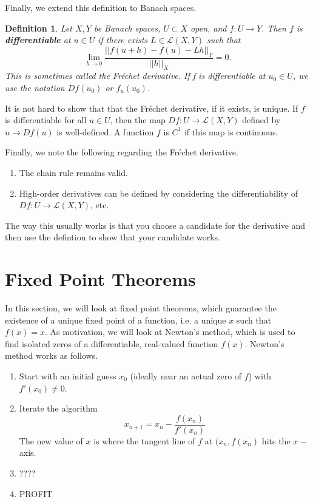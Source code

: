 \documentclass[10pt]{article}         %
\newtheorem{definition}{Definition}[section]
\theoremstyle{remark}
\begin{document}
Finally, we extend this definition to Banach spaces.

\begin{definition}
Let $X, Y$ be Banach spaces, $U \subset X$ open, and $f \colon U \rightarrow Y$. Then $f$ is \textbf{differentiable} at $u \in U$ if there exists $L \in \mathcal{L}(X, Y)$ such that
\[
\lim_{h \rightarrow 0} \frac{ ||f(u + h) - f(u) - Lh ||_Y}{||h||_X} = 0.
\]
This is sometimes called the Fr\'{e}chet derivative. If f is differentiable at $u_0 \in U$, we use the notation $Df(u_0)$ or $f_u(u_0)$.
\end{definition}

It is not hard to show that that the Fr\'{e}chet derivative, if it exists, is unique. If $f$ is differentiable for all $u \in U$, then the map $Df\colon U \rightarrow \mathcal{L}(X,Y)$ defined by $u \rightarrow Df(u)$ is well-defined. A function $f$ is $C^1$ if this map is continuous.

Finally, we note the following regarding the Fr\'{e}chet derivative.

\begin{enumerate}
    \item The chain rule remains valid.
    \item High-order derivatives can be defined by considering the differentiability of $Df: U \rightarrow \mathcal{L}(X,Y)$, etc.
\end{enumerate}

The way this usually works is that you choose a candidate for the derivative and then use the defintion to show that your candidate works.

\section{Fixed Point Theorems}

In this section, we will look at fixed point theorems, which guarantee the existence of a unique fixed point of a function, i.e. a unique $x$ such that $f(x) = x$. As motivation, we will look at Newton's method, which is used to find isolated zeros of a differentiable, real-valued function $f(x)$. Newton's method works as follows.

\begin{enumerate}
\item Start with an initial guess $x_0$ (ideally near an actual zero of $f$) with $f'(x_0) \neq 0$.
\item Iterate the algorithm 
\[
x_{n+1} = x_n - \frac{f(x_n)}{f'(x_n)}
\]
The new value of $x$ is where the tangent line of $f$ at $(x_n, f(x_n)$ hits the $x-$axis.
\item ????
\item PROFIT
\end{enumerate}
\end{document}
